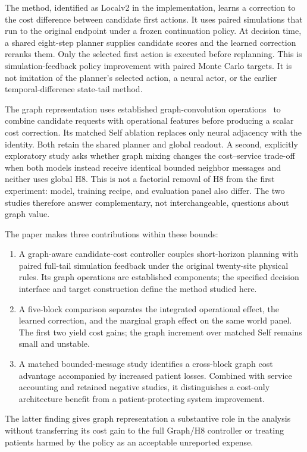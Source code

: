 \documentclass[preprint,12pt]{elsarticle}
\begin{document}
The method, identified as Localv2 in the implementation, learns a correction to
the cost difference between candidate first actions. It uses paired simulations
that run to the original endpoint under a frozen continuation policy. At
decision time, a shared eight-step planner supplies candidate scores and the
learned correction reranks them. Only the selected first action is executed
before replanning. This is simulation-feedback policy improvement with paired
Monte Carlo targets. It is not imitation of the planner's selected action,
a neural actor, or the earlier temporal-difference state-tail method.

The graph representation uses established graph-convolution operations~\cite{Kipf2017}
to combine candidate requests with operational features before producing a
scalar cost correction. Its matched Self ablation replaces only neural
adjacency with the identity. Both retain the shared planner and global readout.
A second, explicitly exploratory study asks whether graph mixing changes the
cost--service trade-off when both models instead receive identical bounded
neighbor messages and neither uses global H8. This is not a factorial removal
of H8 from the first experiment: model, training recipe, and evaluation panel
also differ. The two studies therefore answer complementary, not interchangeable,
questions about graph value.

The paper makes three contributions within these bounds:
\begin{enumerate}
\item A graph-aware candidate-cost controller couples short-horizon planning
with paired full-tail simulation feedback under the original twenty-site
physical rules. Its graph operations are established components; the specified
decision interface and target construction define the method studied here.
\item A five-block comparison separates the integrated operational effect,
the learned correction, and the marginal graph effect on the same world panel.
The first two yield cost gains; the graph increment over matched Self remains
small and unstable.
\item A matched bounded-message study identifies a cross-block graph cost
advantage accompanied by increased patient losses. Combined with service
accounting and retained negative studies, it distinguishes a cost-only
architecture benefit from a patient-protecting system improvement.
\end{enumerate}
The latter finding gives graph representation a substantive role in the
analysis without transferring its cost gain to the full Graph/H8 controller
or treating patients harmed by the policy as an acceptable unreported expense.
\end{document}
